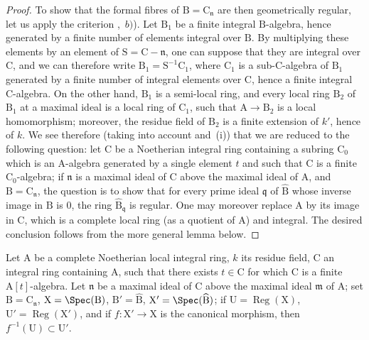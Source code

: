 \begin{proof}
To show that the formal fibres of $\mathrm{B}=\mathrm{C}_\mathfrak{n}$ are then geometrically regular, let us apply the criterion ,~$b)$).
Let $\mathrm{B}_1$ be a finite integral $\mathrm{B}$-algebra, hence generated by a finite number of elements integral over $\mathrm{B}$.
By multiplying these elements by an element of $\mathrm{S}=\mathrm{C}-\mathfrak{n}$, one can suppose that they are integral over $\mathrm{C}$, and we can therefore write $\mathrm{B}_1=\mathrm{S}^{-1}\mathrm{C}_1$, where $\mathrm{C}_1$ is a sub-C-algebra of $\mathrm{B}_1$ generated by a finite number of integral elements over $\mathrm{C}$, hence a finite integral C-algebra.
On the other hand, $\mathrm{B}_1$ is a semi-local ring, and every local ring $\mathrm{B}_2$ of $\mathrm{B}_1$ at a maximal ideal is a local ring of $\mathrm{C}_1$, such that $\mathrm{A}\to\mathrm{B}_2$ is a local homomorphism; moreover, the residue field of $\mathrm{B}_2$ is a finite extension of $k'$, hence of $k$.
We see therefore (taking into account  and~(i)) that we are reduced to the following question: let $\mathrm{C}$ be a Noetherian integral ring containing a subring $\mathrm{C}_0$ which is an $\mathrm{A}$-algebra generated by a single element $t$ and such that $\mathrm{C}$ is a finite $\mathrm{C}_0$-algebra; if $\mathfrak{n}$ is a maximal ideal of $\mathrm{C}$
above the maximal ideal of $\mathrm{A}$, and $\mathrm{B}=\mathrm{C}_\mathfrak{n}$, the question is to show that for every prime ideal $\mathfrak{q}$ of $\widehat{\mathrm{B}}$ whose inverse image in $\mathrm{B}$ is $0$, the ring $\widehat{\mathrm{B}}_\mathfrak{q}$ is regular.
One may moreover replace $\mathrm{A}$ by its image in $\mathrm{C}$, which is a complete local ring (as a quotient of $\mathrm{A}$) and integral. The desired conclusion follows from the more general lemma below.
\end{proof}

\begin{lemma}[7.4.4.2]
\label{IV.7.4.4.2}
Let $\mathrm{A}$ be a complete Noetherian local integral ring, $k$ its residue field, $\mathrm{C}$ an integral ring containing $\mathrm{A}$, such that there exists $t\in\mathrm{C}$ for which $\mathrm{C}$ is a finite $\mathrm{A}[t]$-algebra.
Let $\mathfrak{n}$ be a maximal ideal of $\mathrm{C}$ above the maximal ideal $\mathfrak{m}$ of $\mathrm{A}$; set $\mathrm{B}=\mathrm{C}_\mathfrak{n}$, $\mathrm{X}=\Spec(\mathrm{B})$, $\mathrm{B}'=\widehat{\mathrm{B}}$, $\mathrm{X}'=\Spec(\widehat{\mathrm{B}})$; if $\mathrm{U}=\operatorname{Reg}(\mathrm{X})$, $\mathrm{U}'=\operatorname{Reg}(\mathrm{X}')$, and if $f:\mathrm{X}'\to\mathrm{X}$ is the canonical morphism, then $f^{-1}(\mathrm{U})\subset\mathrm{U}'$.
\end{lemma}

